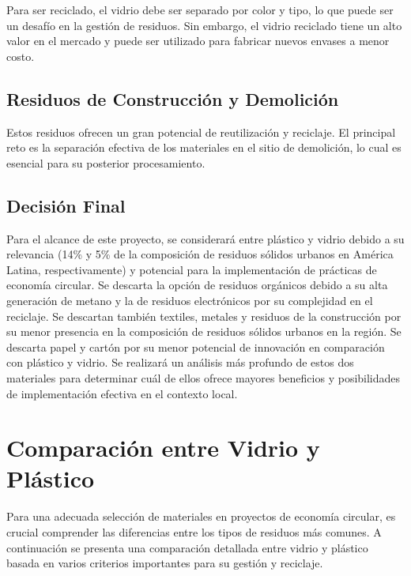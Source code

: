 \documentclass[main.tex]{subfiles}
\begin{document}
Para ser reciclado, el vidrio debe ser separado por color y tipo, lo que puede ser un desafío en la gestión de residuos. Sin embargo, el vidrio reciclado tiene un alto valor en el mercado y puede ser utilizado para fabricar nuevos envases a menor costo.

\subsection{Residuos de Construcción y Demolición}
Estos residuos ofrecen un gran potencial de reutilización y reciclaje. El principal reto es la separación efectiva de los materiales en el sitio de demolición, lo cual es esencial para su posterior procesamiento.

\subsection{Decisión Final}
Para el alcance de este proyecto, se considerará entre plástico y vidrio debido a su relevancia (14\% y 5\% de la composición de residuos sólidos urbanos en América Latina, respectivamente) y potencial para la implementación de prácticas de economía circular. Se descarta la opción de residuos orgánicos debido a su alta generación de metano y la de residuos electrónicos por su complejidad en el reciclaje. Se descartan también textiles, metales y residuos de la construcción por su menor presencia en la composición de residuos sólidos urbanos en la región. Se descarta papel y cartón por su menor potencial de innovación en comparación con plástico y vidrio.
Se realizará un análisis más profundo de estos dos materiales para determinar cuál de ellos ofrece mayores beneficios y posibilidades de implementación efectiva en el contexto local.

\section{Comparación entre Vidrio y Plástico}

Para una adecuada selección de materiales en proyectos de economía circular, es crucial comprender las diferencias entre los tipos de residuos más comunes. A continuación se presenta una comparación detallada entre vidrio y plástico basada en varios criterios importantes para su gestión y reciclaje.
\end{document}
